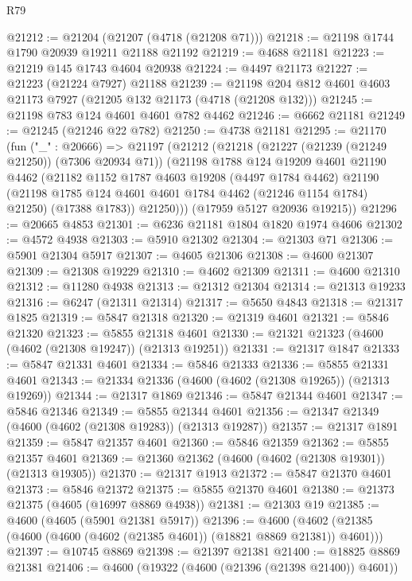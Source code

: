 \begin{lexlean}{R79}
\begin{coremodule}
@21212 := @21204 (@21207 (@4718 (@21208 @71)))
@21218 := @21198 @1744 @1790 @20939 @19211 @21188 @21192
@21219 := @4688 @21181
@21223 := @21219 @145 @1743 @4604 @20938
@21224 := @4497 @21173
@21227 := @21223 (@21224 @7927) @21188
@21239 := @21198 @204 @812 @4601 @4603 @21173 @7927 (@21205 @132 @21173 (@4718 (@21208 @132)))
@21245 := @21198 @783 @124 @4601 @4601 @782 @4462
@21246 := @6662 @21181
@21249 := @21245 (@21246 @22 @782)
@21250 := @4738 @21181
@21295 := @21170
    (fun ("_" : @20666) =>
    @21197
      (@21212
        (@21218
          (@21227 (@21239 (@21249 @21250)) (@7306 @20934 @71))
          (@21198
            @1788
            @124
            @19209
            @4601
            @21190
            @4462
            (@21182
              @1152
              @1787
              @4603
              @19208
              (@4497 @1784 @4462)
              @21190
              (@21198 @1785 @124 @4601 @4601 @1784 @4462 (@21246 @1154 @1784) @21250)
              (@17388 @1783))
            @21250)))
      (@17959 @5127 @20936 @19215))
@21296 := @20665 @4853
@21301 := @6236 @21181 @1804 @1820 @1974 @4606
@21302 := @4572 @4938
@21303 := @5910 @21302
@21304 := @21303 @71
@21306 := @5901 @21304 @5917
@21307 := @4605 @21306
@21308 := @4600 @21307
@21309 := @21308 @19229
@21310 := @4602 @21309
@21311 := @4600 @21310
@21312 := @11280 @4938
@21313 := @21312 @21304
@21314 := @21313 @19233
@21316 := @6247 (@21311 @21314)
@21317 := @5650 @4843
@21318 := @21317 @1825
@21319 := @5847 @21318
@21320 := @21319 @4601
@21321 := @5846 @21320
@21323 := @5855 @21318 @4601
@21330 := @21321 @21323 (@4600 (@4602 (@21308 @19247)) (@21313 @19251))
@21331 := @21317 @1847
@21333 := @5847 @21331 @4601
@21334 := @5846 @21333
@21336 := @5855 @21331 @4601
@21343 := @21334 @21336 (@4600 (@4602 (@21308 @19265)) (@21313 @19269))
@21344 := @21317 @1869
@21346 := @5847 @21344 @4601
@21347 := @5846 @21346
@21349 := @5855 @21344 @4601
@21356 := @21347 @21349 (@4600 (@4602 (@21308 @19283)) (@21313 @19287))
@21357 := @21317 @1891
@21359 := @5847 @21357 @4601
@21360 := @5846 @21359
@21362 := @5855 @21357 @4601
@21369 := @21360 @21362 (@4600 (@4602 (@21308 @19301)) (@21313 @19305))
@21370 := @21317 @1913
@21372 := @5847 @21370 @4601
@21373 := @5846 @21372
@21375 := @5855 @21370 @4601
@21380 := @21373 @21375 (@4605 (@16997 @8869 @4938))
@21381 := @21303 @19
@21385 := @4600 (@4605 (@5901 @21381 @5917))
@21396 := @4600 (@4602 (@21385 (@4600 (@4600 (@4602 (@21385 @4601)) (@18821 @8869 @21381)) @4601)))
@21397 := @10745 @8869
@21398 := @21397 @21381
@21400 := @18825 @8869 @21381
@21406 := @4600 (@19322 (@4600 (@21396 (@21398 @21400)) @4601))

\end{coremodule}
\end{lexlean}
